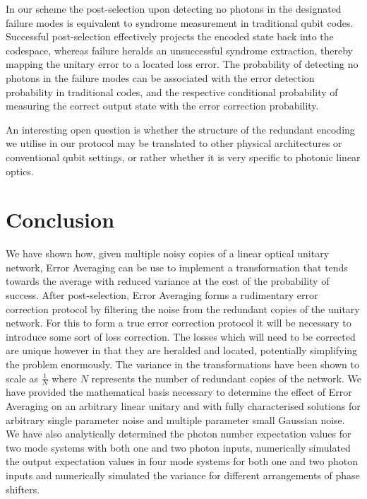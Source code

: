 \documentclass[aps,pra,twocolumn,superscriptaddress,numerical,floatfix]{revtex4-1}
\begin{document}
In our scheme the post-selection upon detecting no photons in the designated failure modes is equivalent to syndrome measurement in traditional qubit codes. Successful post-selection effectively projects the encoded state back into the codespace, whereas failure heralds an unsuccessful syndrome extraction, thereby mapping the unitary error to a located loss error. The probability of detecting no photons in the failure modes can be associated with the error detection probability in traditional codes, and the respective conditional probability of measuring the correct output state with the error correction probability.

An interesting open question is whether the structure of the redundant encoding we utilise in our protocol may be translated to other physical architectures or conventional qubit settings, or rather whether it is very specific to photonic linear optics.

\section{Conclusion\label{Conclusion}}

We have shown how, given multiple noisy copies of a linear optical unitary network, Error Averaging can be use to implement a transformation that tends towards the average with reduced variance at the cost of the probability of success.  After post-selection, Error Averaging forms a rudimentary error correction protocol by filtering the noise from the redundant copies of the unitary network. For this to form a true error correction protocol it will be necessary to introduce some sort of loss correction. The losses which will need to be corrected are unique however in that they are heralded and located, potentially simplifying the problem enormously. The variance in the transformations have been shown to scale as $\frac{1}{N}$ where $N$ represents the number of redundant copies of the network.  We have provided the mathematical basis necessary to determine the effect of Error Averaging on an arbitrary linear unitary and with fully characterised solutions for arbitrary single parameter noise and multiple parameter small Gaussian noise. We have also analytically determined the photon number expectation values for two mode systems with both one and two photon inputs, numerically simulated the output expectation values in four mode systems for both one and two photon inputs and numerically simulated the variance for different arrangements of phase shifters.
\end{document}
